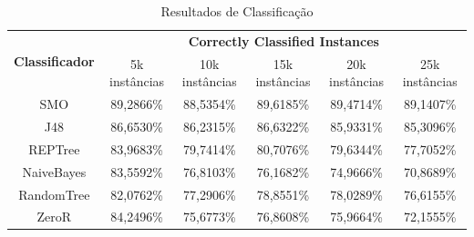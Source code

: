 \documentclass[
	12pt,				%
	openright,			%
	oneside,	
	a4paper,				%
	english,				%
	brazil				%
]{abntex2/abntex2} %
\begin{document}
	
	\begin{table}[!htb]
		\centering
		\caption{Resultados de Classificação}
		\label{tabResultadosClassificacao}
		\begin{flushleft}
		\renewcommand{\arraystretch}{2}	
		\begin{tabular}{cccccc}
			\hline
			\multicolumn{1}{c|}{\multirow{2}{*}{\textbf{Classificador}}} & \multicolumn{5}{c}{\textbf{Correctly Classified Instances}}                       \\ \cline{2-6} 
			\multicolumn{1}{c|}{}                                        & 5k instâncias & 10k instâncias & 15k instâncias & 20k instâncias & 25k instâncias \\ \hline
			SMO                                                          & 89,2866\%     & 88,5354\%      & 89,6185\%      & 89,4714\%      & 89,1407\%      \\
			J48                                                          & 86,6530\%      & 86,2315\%      & 86,6322\%      & 85,9331\%      & 85,3096\%      \\
			REPTree                                                      & 83,9683\%     & 79,7414\%      & 80,7076\%      & 79,6344\%      & 77,7052\%      \\
			NaiveBayes                                                   & 83,5592\%     & 76,8103\%      & 76,1682\%      & 74,9666\%      & 70,8689\%      \\
			RandomTree                                                   & 82,0762\%     & 77,2906\%      & 78,8551\%      & 78,0289\%      & 76,6155\%      \\
			ZeroR                                                        & 84,2496\%     & 75,6773\%      & 76,8608\%      & 75,9664\%      & 72,1555\%      \\ \hline
		\end{tabular}
	\end{flushleft}
	\end{table}
	
	\pagebreak
	\clearpage
	
\end{document}
